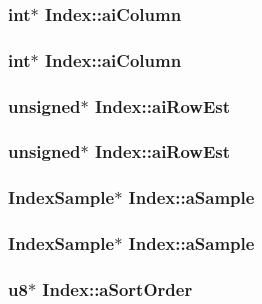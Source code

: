 \subsubsection{\setlength{\rightskip}{0pt plus 5cm}int$\ast$ \bf{Index::ai\-Column}}\label{structIndex_a3fc3db9019068e9e00daadcc5ed2a60}


\subsubsection{\setlength{\rightskip}{0pt plus 5cm}int$\ast$ \bf{Index::ai\-Column}}\label{structIndex_a3fc3db9019068e9e00daadcc5ed2a60}


\subsubsection{\setlength{\rightskip}{0pt plus 5cm}unsigned$\ast$ \bf{Index::ai\-Row\-Est}}\label{structIndex_78214b4595736cd524e99ab4e3c032ac}


\subsubsection{\setlength{\rightskip}{0pt plus 5cm}unsigned$\ast$ \bf{Index::ai\-Row\-Est}}\label{structIndex_78214b4595736cd524e99ab4e3c032ac}


\subsubsection{\setlength{\rightskip}{0pt plus 5cm}\bf{Index\-Sample}$\ast$ \bf{Index::a\-Sample}}\label{structIndex_31d17369d8f04f511c1d583aae5ee0d5}


\subsubsection{\setlength{\rightskip}{0pt plus 5cm}\bf{Index\-Sample}$\ast$ \bf{Index::a\-Sample}}\label{structIndex_31d17369d8f04f511c1d583aae5ee0d5}


\subsubsection{\setlength{\rightskip}{0pt plus 5cm}\bf{u8}$\ast$ \bf{Index::a\-Sort\-Order}}\label{structIndex_a7c4e0c86450d08867f9d081dba2cd21}



